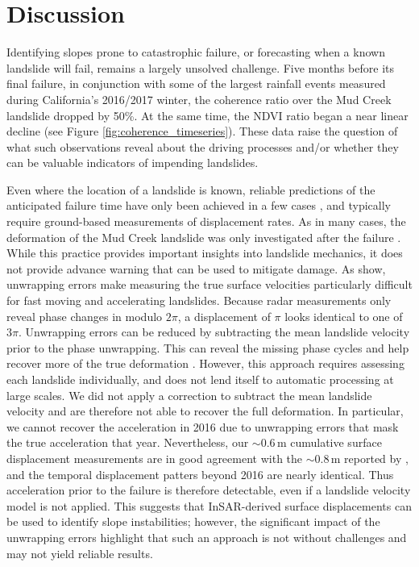 \documentclass[journal abbreviation, manuscript]{copernicus}
\begin{document}
\section{Discussion}
Identifying slopes prone to catastrophic failure, or forecasting when a known landslide will fail, remains a largely unsolved challenge. Five months before its final failure, in conjunction with some of the largest rainfall events measured during California's 2016/2017 winter, the coherence ratio over the Mud Creek landslide dropped by 50\%. At the same time, the NDVI ratio began a near linear decline (see Figure \ref{fig:coherence_timeseries}). These data raise the question of what such observations reveal about the driving processes and/or whether they can be valuable indicators of impending landslides. \par
Even where the location of a landslide is known, reliable predictions of the anticipated failure time have only been achieved in a few cases \citep{Intrieri2019, Loew2016}, and typically require ground-based measurements of displacement rates. As in many cases, the deformation of the Mud Creek landslide was only investigated after the failure \citep{Handwerger2019, handwerger2015}. While this practice provides important insights into landslide mechanics, it does not provide advance warning that can be used to mitigate damage. As \cite{Handwerger2019} show, unwrapping errors make measuring the true surface velocities particularly difficult for fast moving and accelerating landslides. Because radar measurements only reveal phase changes in modulo $2\pi$, a displacement of $\pi$ looks identical to one of $3\pi$. Unwrapping errors can be reduced by subtracting the mean landslide velocity prior to the phase unwrapping. This can reveal the missing phase cycles and help recover more of the true deformation \citep{handwerger2015, Handwerger2019}. However, this approach requires assessing each landslide individually, and does not lend itself to automatic processing at large scales. We did not apply a correction to subtract the mean landslide velocity and are therefore not able to recover the full deformation. In particular, we cannot recover the acceleration in 2016 due to unwrapping errors that mask the true acceleration that year. Nevertheless, our $\sim$0.6\,m cumulative surface displacement measurements are in good agreement with the $\sim$0.8\,m  reported by \cite{Handwerger2019}, and the temporal displacement patters beyond 2016 are nearly identical. Thus acceleration prior to the failure is therefore detectable, even if a landslide velocity model is not applied. This suggests that InSAR-derived surface displacements can be used to identify slope instabilities; however, the significant impact of the unwrapping errors highlight that such an approach is not without challenges and may not yield reliable results. \par
\end{document}
